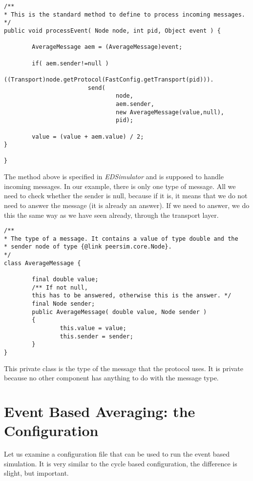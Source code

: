 \documentclass[a4paper,11pt]{article}
\begin{document}
\footnotesize
\begin{verbatim}
/**
* This is the standard method to define to process incoming messages.
*/
public void processEvent( Node node, int pid, Object event ) {
                
        AverageMessage aem = (AverageMessage)event;
        
        if( aem.sender!=null )
                ((Transport)node.getProtocol(FastConfig.getTransport(pid))).
                        send(
                                node,
                                aem.sender,
                                new AverageMessage(value,null),
                                pid);
                                
        value = (value + aem.value) / 2;
}

}
\end{verbatim}
\normalsize

The method above is specified in \emph{EDSimulator} and is supposed to
handle incoming messages.
In our example, there is only one type of message.
All we need to check whether the sender is null, because if it is, it
means that we do not need to answer the message (it is already an answer).
If we need to answer, we do this the same way as we have seen already, through
the transport layer.

\footnotesize
\begin{verbatim}
/**
* The type of a message. It contains a value of type double and the
* sender node of type {@link peersim.core.Node}.
*/
class AverageMessage {

        final double value;
        /** If not null,
        this has to be answered, otherwise this is the answer. */
        final Node sender;
        public AverageMessage( double value, Node sender )
        {
                this.value = value;
                this.sender = sender;
        }
}

\end{verbatim}
\normalsize

This private class is the type of the message that the protocol uses.
It is private because no other component has anything to do with the
message type.

\section{Event Based Averaging: the Configuration}

Let us examine a configuration file that can be used to run the event based
simulation.
It is very similar to the cycle based configuration, the difference is
slight, but important.
\end{document}
